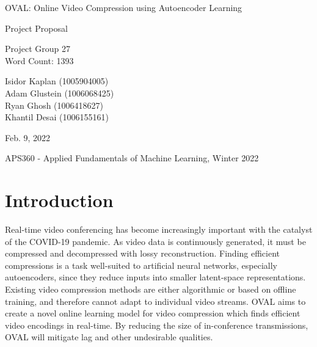 \documentclass[letter, 12pt]{article}
\begin{document}
\begin{titlepage}
   \begin{center}
        \vspace*{2cm}

        \Huge{OVAL: Online Video Compression using Autoencoder Learning}

        \vspace{0.5cm}
        \LARGE{Project Proposal}
            
        \vspace{3 cm}
        \Large{Project Group 27} \\
        \Large{Word Count: 1393}
       
        \vspace{0.25cm}
        \large{Isidor Kaplan (1005904005) \\
        Adam Glustein (1006068425) \\
        Ryan Ghosh (1006418627) \\
        Khantil Desai (1006155161)}
       
        \vspace{3 cm}
        \Large{Feb. 9, 2022}
        
        \vspace{0.25 cm}
        \large{APS360 - Applied Fundamentals of Machine Learning, Winter 2022}
       

       \vfill
    \end{center}
\end{titlepage}

\setcounter{page}{2}
\pagestyle{fancy}
\fancyhf{}
\rhead{\thepage}

\section{Introduction}

Real-time video conferencing has become increasingly important with the catalyst of the COVID-19 pandemic. As video data is continuously generated, it must be compressed and decompressed with lossy reconstruction. Finding efficient compressions is a task well-suited to artificial neural networks, especially autoencoders, since they reduce inputs into smaller latent-space representations. Existing video compression methods are either algorithmic or based on offline training, and therefore cannot adapt to individual video streams. OVAL aims to create a novel online learning model for video compression which finds efficient video encodings in real-time. By reducing the size of in-conference transmissions, OVAL will mitigate lag and other undesirable qualities. 
\end{document}

